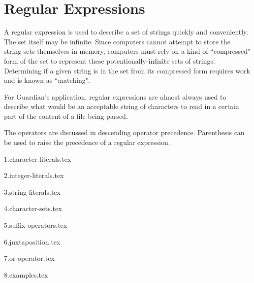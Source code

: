 
\section{Regular Expressions}
\label{sec:regex}
{
	A regular expression is used to describe a set of
	strings quickly and conveniently. The set itself may be infinite.
	Since computers cannot attempt to store the string-sets themselves in
	memory, computers must rely on a kind of ``compressed" form of the set
	to represent
	these potentionally-infinite sets of strings. Determining if a given string
	is in the set from its compressed form requires work and is known
	as ``matching".
	
	For Guardian's application, regular expressions are almost always used
	to describe what would be an acceptable string of characters to read in
	a certain part of the content of a file being parsed.
	
	The operators are discussed in descending operator precedence. Parenthesis
	can be used to raise the precedence of a regular expression.
	
	{1.character-literals.tex}
	
	{2.integer-literals.tex}
	
	{3.string-literals.tex}
	
	{4.character-sets.tex}
	
	{5.suffix-operators.tex}
	
	{6.juxtaposition.tex}
	
	{7.or-operator.tex}
	
	{8.examples.tex}
}

